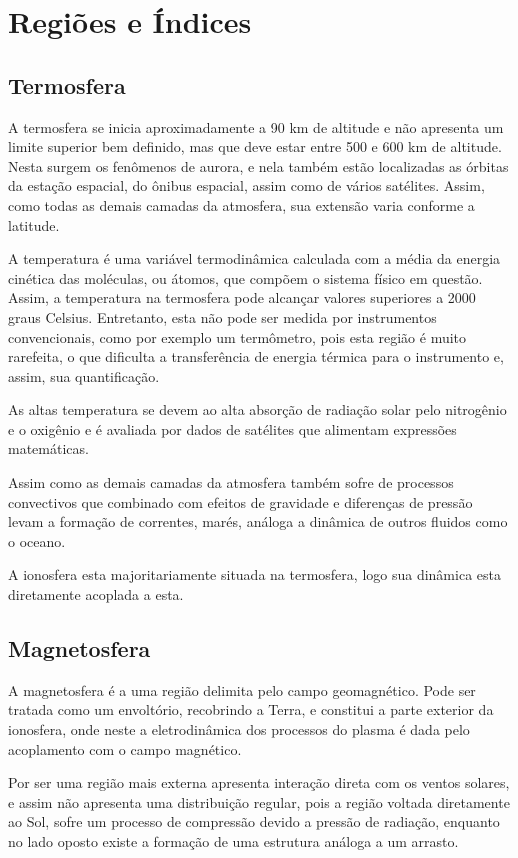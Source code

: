 \section{Regiões e Índices}

\subsection{Termosfera}

A termosfera se inicia aproximadamente a 90 km de altitude e não apresenta um limite superior bem definido, mas que deve estar entre 500 e 600 km de altitude. Nesta surgem os fenômenos de aurora, e nela também estão localizadas as órbitas da estação espacial, do ônibus espacial, assim como de vários satélites. Assim, como todas as demais camadas da atmosfera, sua extensão varia conforme a latitude. 

A temperatura é uma variável termodinâmica calculada com a média da energia cinética das moléculas, ou átomos, que compõem o sistema físico em questão. Assim, a temperatura na termosfera pode alcançar valores superiores a 2000 graus Celsius. Entretanto, esta não pode ser medida por instrumentos convencionais, como por exemplo um termômetro, pois esta região é muito rarefeita, o que dificulta a transferência de energia térmica para o instrumento e, assim, sua quantificação.

As altas temperatura se devem ao alta absorção de radiação solar pelo nitrogênio e o oxigênio e é avaliada por dados de satélites que alimentam expressões matemáticas.

Assim como as demais camadas da atmosfera também sofre de processos convectivos que combinado com efeitos de gravidade e diferenças de pressão levam a formação de correntes, marés, análoga a dinâmica de outros fluidos como o oceano.

A ionosfera esta majoritariamente situada na termosfera, logo sua dinâmica esta diretamente acoplada a esta.

\subsection{Magnetosfera}

A magnetosfera é a uma região delimita pelo campo geomagnético. Pode ser tratada como um envoltório, recobrindo a Terra, e constitui a parte exterior da ionosfera, onde neste a eletrodinâmica dos processos do plasma é dada pelo acoplamento com o campo magnético.

Por ser uma região mais externa apresenta interação direta com os ventos solares, e assim não apresenta uma distribuição regular, pois a região voltada diretamente ao Sol, sofre um processo de compressão devido a pressão de radiação, enquanto no lado oposto existe a formação de uma estrutura análoga a um arrasto.

